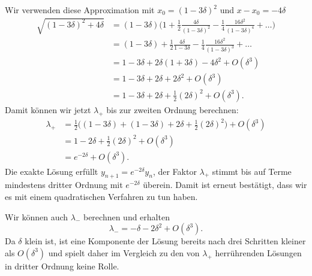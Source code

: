Wir verwenden diese Approximation mit $x_0=(1-3\delta)^2$ und $x-x_0=-4\delta$
%
\begin{align*}
\sqrt{(1-3\delta)^2+4\delta}
&=
(1-3\delta)\biggl(1+\frac12\frac{4\delta}{(1-3\delta)^2}
-\frac14\frac{16\delta^2}{(1-3\delta)^4}+\dots\biggr)
\\
&=(1-3\delta)+\frac12\frac{4\delta}{1-3\delta}
-\frac14\frac{16\delta^2}{(1-3\delta)^3}+\dots
\\
&=1-3\delta+2\delta(1+3\delta)-4\delta^2+O(\delta^3)
\\
&=1-3\delta+2\delta + 2\delta^2+O(\delta^3)
\\
&=1-3\delta+2\delta + \frac12(2\delta)^2+O(\delta^3).
\end{align*}
Damit können wir jetzt $\lambda_+$ bis zur zweiten Ordnung berechnen:
\begin{align*}
\lambda_+
&=
\frac12\biggl((1-3\delta)+ (1-3\delta)+2\delta+\frac12(2\delta)^2\biggr)
+O(\delta^3)
\\
&=
1-2\delta+\frac12(2\delta)^2+O(\delta^3)
\\
&=e^{-2\delta}+O(\delta^3).
\end{align*}
Die exakte Lösung erfüllt $y_{n+1}=e^{-2\delta}y_n$, der Faktor
$\lambda_+$ stimmt bis auf Terme mindestens dritter Ordnung mit 
$e^{-2\delta}$ überein.
Damit ist erneut bestätigt, dass wir es mit einem quadratischen Verfahren zu
tun haben.

Wir können auch $\lambda_-$ berechnen und erhalten
\[
\lambda_-=-\delta-2\delta^2+O(\delta^3).
\]
Da $\delta$ klein ist, ist eine Komponente der Lösung bereits nach
drei Schritten kleiner als $O(\delta^3)$ und spielt daher im Vergleich
zu den von $\lambda_+$ herrührenden Lösungen in dritter Ordnung keine
Rolle.

